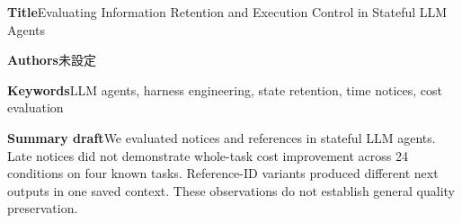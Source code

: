 \documentclass[uplatex,a4paper,twocolumn,10pt]{jsarticle}
\begin{document}
\clearpage
\onecolumn
\noindent\textbf{Title}\quad Evaluating Information Retention and Execution Control in Stateful LLM Agents

\noindent\textbf{Authors}\quad 未設定

\noindent\textbf{Keywords}\quad LLM agents, harness engineering, state retention, time notices, cost evaluation

\noindent\textbf{Summary draft}\quad We evaluated notices and references in stateful LLM agents. Late notices did not demonstrate whole-task cost improvement across 24 conditions on four known tasks. Reference-ID variants produced different next outputs in one saved context. These observations do not establish general quality preservation.
\end{document}
